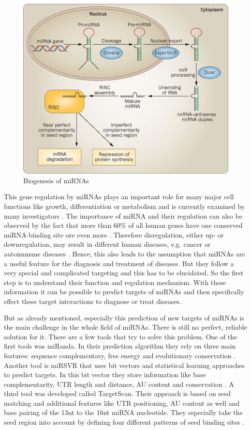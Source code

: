 \documentclass[12pt]{article}
\begin{document}
\begin{figure}
\centering
\includegraphics[scale=0.5]{results/biogenesis.png}
\caption{Biogenesis of miRNAs}
\label{biogenesis}
\end{figure}
  
This gene regulation by miRNAs plays an important role for many major cell functions like growth, differentiation or metabolism and is currently examined by many investigators \cite{Ardekani}. The importance of miRNA and their regulation can also be observed by the fact that more than 60\% of all human genes have one conserved miRNA-binding site ore even more \cite{Ha}. Therefore disregulation, either up- or downregulation, may result in different human diseases, e.g. cancer or autoimmune diseases \cite{Ardekani}. Hence, this also leads to the assumption that miRNAs are a useful feature for the diagnosis and treatment of diseases. But they follow a very special and complicated targeting and this has to be elucidated. So the first step is to understand their function and regulation mechanism. With these information it can be possible to predict targets of miRNAs and then specifically effect these target interactions to diagnose or treat diseases.  

But as already mentioned, especially this prediction of new targets of miRNAs is the main challenge in the whole field of miRNAs. There is still no perfect, reliable solution for it. There are a few tools that try to solve this problem. One of the first tools was miRanda. In their prediction algorithm they rely on three main features: sequence complementary, free energy and evolutionary conservation \cite{Enright}. Another tool is miRSVR that uses bit vectors and statistical learning approaches to predict targets. In this bit vector they store information like base complementarity, UTR length and distance, AU content and conservation \cite{Betel}. A third tool was developed called TargetScan. Their approach is based on seed matching and additional features like UTR positioning, AU content as well and base pairing of the 13nt to the 16nt miRNA nucleotide. They especially take the seed region into account by defining four different patterns of seed binding sites \cite{Lewis}.
\end{document}
